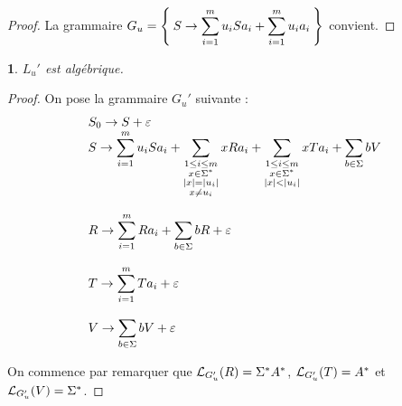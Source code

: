 \documentclass[11pt,a4paper]{article}
\theoremstyle{plain}
\theoremstyle{definition}
\theoremstyle{definition}
\theoremstyle{remark}
\theoremstyle{remark}
\theoremstyle{plain}
\newtheorem{lem}[thm]{\protect\lemmaname}
\theoremstyle{plain}
\theoremstyle{plain}
\theoremstyle{remark}
\providecommand{\lemmaname}{Lemme}
\begin{document}
\begin{proof}
	La grammaire $\displaystyle G_u = \Set{S\to \sum_{i=1}^mu_iSa_i+\sum_{i=1}^mu_ia_i}$ convient.
\end{proof}

\begin{lem}
	$L_u'$ est algébrique.
\end{lem}

\begin{proof}
	On pose la grammaire $G_u'$ suivante :
	\[\begin{array}{l}
	\displaystyle S_0 \to S + \varepsilon\\
	\displaystyle S\to \sum_{i=1}^mu_iSa_i + \sum_{\substack{1\le i \le m\\x\in\Sigma^*\\ \left|x\right|=\left|u_i\right|\\x\not=u_i}}xRa_i+\sum\limits_{\substack{1\le i\le m\\x\in\Sigma^*\\\left|x\right|<\left|u_i\right|}}xTa_i+\sum\limits_{b\in \Sigma}bV\\\\
	\displaystyle R\to \sum_{i=1}^mRa_i+\sum_{b\in\Sigma}bR+\varepsilon\\\\
	\displaystyle T\to \sum_{i=1}^mTa_i+\varepsilon\\\\
	\displaystyle V\to \sum_{b\in\Sigma}bV+\varepsilon
	\end{array}\]
	
	On commence par remarquer que $\mathcal{L}_{G_u'}(R)=\Sigma^*A^*$, $\mathcal{L}_{G_u'}(T)=A^*$ et $\mathcal{L}_{G_u'}(V)=\Sigma^*$.
	

\end{proof}
\end{document}

